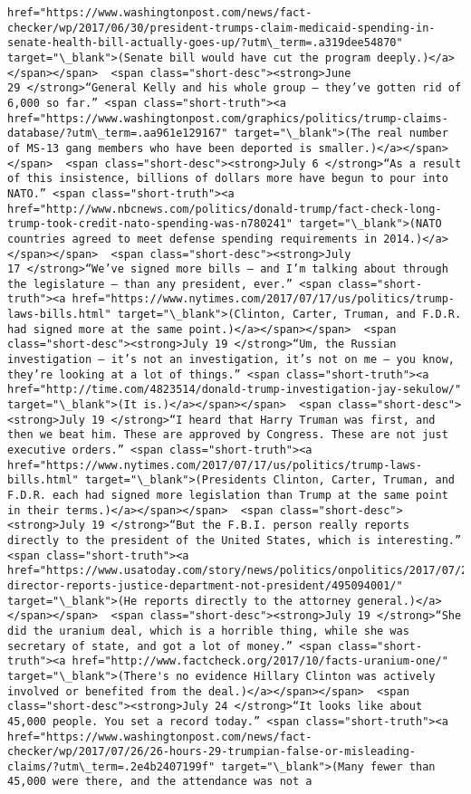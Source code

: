 \documentclass[11pt]{article}
\begin{document}
\begin{Verbatim}[commandchars=\\\{\}]
href="https://www.washingtonpost.com/news/fact-checker/wp/2017/06/30/president-trumps-claim-medicaid-spending-in-senate-health-bill-actually-goes-up/?utm\_term=.a319dee54870" target="\_blank">(Senate bill would have cut the program deeply.)</a></span></span>  <span class="short-desc"><strong>June 29 </strong>“General Kelly and his whole group — they’ve gotten rid of 6,000 so far.” <span class="short-truth"><a href="https://www.washingtonpost.com/graphics/politics/trump-claims-database/?utm\_term=.aa961e129167" target="\_blank">(The real number of MS-13 gang members who have been deported is smaller.)</a></span></span>  <span class="short-desc"><strong>July 6 </strong>“As a result of this insistence, billions of dollars more have begun to pour into NATO.” <span class="short-truth"><a href="http://www.nbcnews.com/politics/donald-trump/fact-check-long-trump-took-credit-nato-spending-was-n780241" target="\_blank">(NATO countries agreed to meet defense spending requirements in 2014.)</a></span></span>  <span class="short-desc"><strong>July 17 </strong>“We’ve signed more bills — and I’m talking about through the legislature — than any president, ever.” <span class="short-truth"><a href="https://www.nytimes.com/2017/07/17/us/politics/trump-laws-bills.html" target="\_blank">(Clinton, Carter, Truman, and F.D.R. had signed more at the same point.)</a></span></span>  <span class="short-desc"><strong>July 19 </strong>“Um, the Russian investigation — it’s not an investigation, it’s not on me — you know, they’re looking at a lot of things.” <span class="short-truth"><a href="http://time.com/4823514/donald-trump-investigation-jay-sekulow/" target="\_blank">(It is.)</a></span></span>  <span class="short-desc"><strong>July 19 </strong>“I heard that Harry Truman was first, and then we beat him. These are approved by Congress. These are not just executive orders.” <span class="short-truth"><a href="https://www.nytimes.com/2017/07/17/us/politics/trump-laws-bills.html" target="\_blank">(Presidents Clinton, Carter, Truman, and F.D.R. each had signed more legislation than Trump at the same point in their terms.)</a></span></span>  <span class="short-desc"><strong>July 19 </strong>“But the F.B.I. person really reports directly to the president of the United States, which is interesting.” <span class="short-truth"><a href="https://www.usatoday.com/story/news/politics/onpolitics/2017/07/20/fbi-director-reports-justice-department-not-president/495094001/" target="\_blank">(He reports directly to the attorney general.)</a></span></span>  <span class="short-desc"><strong>July 19 </strong>“She did the uranium deal, which is a horrible thing, while she was secretary of state, and got a lot of money.” <span class="short-truth"><a href="http://www.factcheck.org/2017/10/facts-uranium-one/" target="\_blank">(There's no evidence Hillary Clinton was actively involved or benefited from the deal.)</a></span></span>  <span class="short-desc"><strong>July 24 </strong>“It looks like about 45,000 people. You set a record today.” <span class="short-truth"><a href="https://www.washingtonpost.com/news/fact-checker/wp/2017/07/26/26-hours-29-trumpian-false-or-misleading-claims/?utm\_term=.2e4b2407199f" target="\_blank">(Many fewer than 45,000 were there, and the attendance was not a 
\end{Verbatim}
\end{document}
